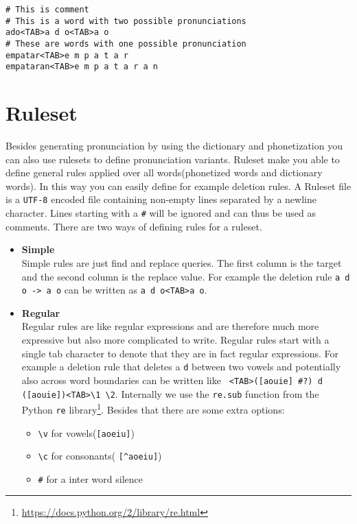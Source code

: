 \begin{lstlisting}[caption={Example dictionary},label={lst:exampledictionary}]
# This is comment
# This is a word with two possible pronunciations
ado<TAB>a d o<TAB>a o
# These are words with one possible pronunciation
empatar<TAB>e m p a t a r
empataran<TAB>e m p a t a r a n
\end{lstlisting}
	
\section{Ruleset}
Besides generating pronunciation by using the dictionary and phonetization you
can also use rulesets to define pronunciation variants. Ruleset make you able
to define general rules applied over all words(phonetized words and dictionary
words). In this way you can easily define for example deletion rules.
A Ruleset file is a \texttt{UTF-8} encoded
file containing non-empty lines separated by a newline character. Lines
starting with a \texttt{\#} will be ignored and can thus be used as comments.
There are two ways of defining rules for a ruleset.
\begin{itemize}
	\item \textbf{Simple}\\
		Simple rules are just find and replace queries. The first column is the
		target and the second column is the replace value. For example the deletion
		rule \texttt{a d o -> a o} can be written as \texttt{a d o<TAB>a o}.
	\item \textbf{Regular}\\
		Regular rules are like regular expressions and are therefore much more
		expressive but also more complicated to write. Regular rules start with a
		single tab character to denote that they are in fact regular expressions.
		For example a deletion rule that deletes a \texttt{d} between two vowels
		and potentially also across word boundaries can be written like \texttt{%
		<TAB>([aouie] \#?) d ([aouie])<TAB>\textbackslash 1 \textbackslash 2}.
		Internally we use the \texttt{re.sub} function from the Python \texttt{re}
		library\footnote{\url{https://docs.python.org/2/library/re.html}}. Besides
		that there are some extra options:
		\begin{itemize}
			\item \texttt{\textbackslash v} for vowels(\texttt{[aoeiu]})
			\item \texttt{\textbackslash c} for consonants(%
				\texttt{[\textasciicircum aoeiu]})
			\item \texttt{\#} for a inter word silence
		\end{itemize}
\end{itemize}

